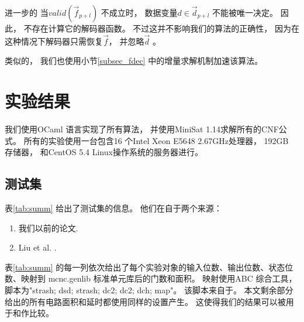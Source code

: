 进一步的
当$valid(\vec{f}_{p+l})$ 不成立时，
数据变量$d\in\vec{d}_{p+l}$ 不能被唯一决定。
因此，
不存在计算它的解码器函数。
不过这并不影响我们的算法的正确性，
因为在这种情况下解码器只需恢复$\vec{f}$，
并忽略$\vec{d}$ 。

类似的，
我们也使用小节\ref{subsec_fdec} 中的增量求解机制加速该算法。



\section{实验结果}\label{sec_exp_chap3}

我们使用OCaml 语言实现了所有算法，
并使用MiniSat 1.14求解所有的CNF公式。
所有的实验使用一台包含16 个Intel Xeon E5648 2.67GHz处理器，
192GB 存储器， 和CentOS 5.4 Linux操作系统的服务器进行。

\subsection{测试集}
表\ref{tab:summ} 给出了测试集的信息。
他们在自于两个来源：
\begin{enumerate}
 \item 我们以前的论文.
 \item Liu et al. .
\end{enumerate}

表\ref{tab:summ} 的每一列依次给出了每个实验对象的输入位数、输出位数、状态位数、映射到 mcnc.genlib 标准单元库后的门数和面积。
映射使用ABC 综合工具，
脚本为"strash; dsd; strash; dc2; dc2; dch; map"。
该脚本来自于。
本文剩余部分给出的所有电路面积和延时都使用同样的设置产生。
这使得我们的结果可以被用于和作比较。

